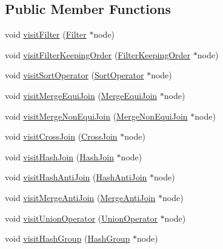 \subsection*{Public Member Functions}
\begin{DoxyCompactItemize}
\item 
void \hyperlink{class_cloning_physical_operator_visitor_ac1b811ff2fd316b05d64f85c2e87fd9c}{visit\+Filter} (\hyperlink{class_filter}{Filter} $\ast$node)
\item 
void \hyperlink{class_cloning_physical_operator_visitor_a41aff61c8da3a7b88beddb6aaffb211e}{visit\+Filter\+Keeping\+Order} (\hyperlink{class_filter_keeping_order}{Filter\+Keeping\+Order} $\ast$node)
\item 
void \hyperlink{class_cloning_physical_operator_visitor_a5bb911312d752fcc31b48bb21f658bdf}{visit\+Sort\+Operator} (\hyperlink{class_sort_operator}{Sort\+Operator} $\ast$node)
\item 
void \hyperlink{class_cloning_physical_operator_visitor_ae1eb095ee91c30030c7830a9b999a6ec}{visit\+Merge\+Equi\+Join} (\hyperlink{class_merge_equi_join}{Merge\+Equi\+Join} $\ast$node)
\item 
void \hyperlink{class_cloning_physical_operator_visitor_a6b17fd37e070917db7152f869517eb4a}{visit\+Merge\+Non\+Equi\+Join} (\hyperlink{class_merge_non_equi_join}{Merge\+Non\+Equi\+Join} $\ast$node)
\item 
void \hyperlink{class_cloning_physical_operator_visitor_aa48e6141645ce53d8cae2b1678fdc2d4}{visit\+Cross\+Join} (\hyperlink{class_cross_join}{Cross\+Join} $\ast$node)
\item 
void \hyperlink{class_cloning_physical_operator_visitor_abb1f8426172480eb5968abd7f9deb541}{visit\+Hash\+Join} (\hyperlink{class_hash_join}{Hash\+Join} $\ast$node)
\item 
void \hyperlink{class_cloning_physical_operator_visitor_a661c04bfbdf0d36e745fc82bf8f8a193}{visit\+Hash\+Anti\+Join} (\hyperlink{class_hash_anti_join}{Hash\+Anti\+Join} $\ast$node)
\item 
void \hyperlink{class_cloning_physical_operator_visitor_af32410ddcbf200eb102bbe8ad5ad1859}{visit\+Merge\+Anti\+Join} (\hyperlink{class_merge_anti_join}{Merge\+Anti\+Join} $\ast$node)
\item 
void \hyperlink{class_cloning_physical_operator_visitor_af9199524feba8c12ceff7d78c1915064}{visit\+Union\+Operator} (\hyperlink{class_union_operator}{Union\+Operator} $\ast$node)
\item 
void \hyperlink{class_cloning_physical_operator_visitor_aa3a6b9d8327700089089e57e18861d6d}{visit\+Hash\+Group} (\hyperlink{class_hash_group}{Hash\+Group} $\ast$node)

\end{DoxyCompactItemize}
